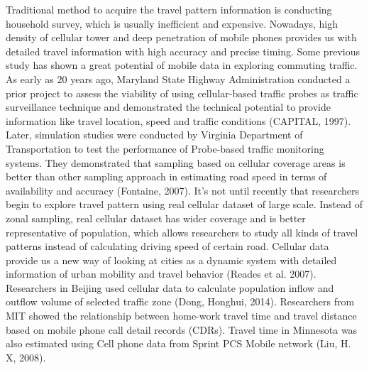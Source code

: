 \documentclass[hidelinks,12pt]{article}
\begin{document}
	Traditional method to acquire the travel pattern information is conducting household survey, which is usually inefficient and expensive. Nowadays, high density of cellular tower and deep penetration of mobile phones provides us with detailed travel information with high accuracy and precise timing. Some previous study has shown a great potential of mobile data in exploring commuting traffic. As early as 20 years ago, Maryland State Highway Administration conducted a prior project to assess the viability of using cellular-based traffic probes as traffic surveillance technique and demonstrated the technical potential to provide information like travel location, speed and traffic conditions (CAPITAL, 1997). Later, simulation studies were conducted by Virginia Department of Transportation to test the performance of Probe-based traffic monitoring systems. They demonstrated that sampling based on cellular coverage areas is better than other sampling approach in estimating road speed in terms of availability and accuracy (Fontaine, 2007). It’s not until recently that researchers begin to explore travel pattern using real cellular dataset of large scale. Instead of zonal sampling, real cellular dataset has wider coverage and is better representative of population, which allows researchers to study all kinds of travel patterns instead of calculating driving speed of certain road. Cellular data provide us a new way of looking at cities as a dynamic system with detailed information of urban mobility and travel behavior (Reades et al. 2007).  Researchers in Beijing used cellular data to calculate population inflow and outflow volume of selected traffic zone (Dong, Honghui, 2014). Researchers from MIT showed the relationship between home-work travel time and travel distance based on mobile phone call detail records (CDRs). Travel time in Minnesota was also estimated using Cell phone data from Sprint PCS Mobile network (Liu, H. X, 2008). 
	
\end{document}
